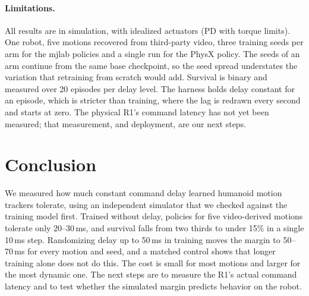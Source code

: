 \documentclass{l4dc2026}
\begin{document}
\paragraph{Limitations.}
All results are in simulation, with idealized actuators (PD with torque limits).
One robot, five motions recovered from third-party video, three training seeds per arm for the mjlab policies and a single run for the PhysX policy.
The seeds of an arm continue from the same base checkpoint, so the seed spread understates the variation that retraining from scratch would add.
Survival is binary and measured over 20 episodes per delay level.
The harness holds delay constant for an episode, which is stricter than training, where the lag is redrawn every second and starts at zero.
The physical R1's command latency has not yet been measured; that measurement, and deployment, are our next steps.

\section{Conclusion}

We measured how much constant command delay learned humanoid motion trackers tolerate, using an independent simulator that we checked against the training model first.
Trained without delay, policies for five video-derived motions tolerate only 20--30\,ms, and survival falls from two thirds to under 15\% in a single 10\,ms step.
Randomizing delay up to 50\,ms in training moves the margin to 50--70\,ms for every motion and seed, and a matched control shows that longer training alone does not do this.
The cost is small for most motions and larger for the most dynamic one.
The next steps are to measure the R1's actual command latency and to test whether the simulated margin predicts behavior on the robot.


\end{document}
